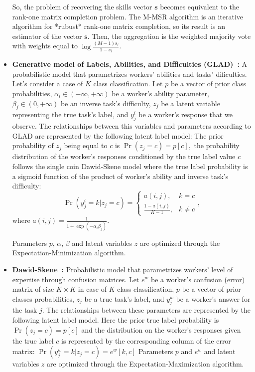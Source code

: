 \begin{itemize}
            So, the problem of recovering the skills vector $\boldsymbol{s}$ becomes equivalent to the
            rank-one matrix completion problem. The M-MSR algorithm is an iterative algorithm for *rubust* rank-one matrix completion, so its result is an estimator of the vector $\boldsymbol{s}$.
            Then, the aggregation is the weighted majority vote with weights equal to
            $\log \frac{(M-1)s_i}{1-s_i}$.
    \item \textbf{Generative model of Labels, Abilities, and Difficulties (GLAD)~\cite{whitehill_Whose_2009}:}
    A probabilistic model that parametrizes workers' abilities and tasks' dificulties.
    Let's consider a case of $K$ class classification. Let $p$ be a vector of prior class probabilities, $\alpha_i \in (-\infty, +\infty)$ be a worker's ability parameter, $\beta_j \in (0, +\infty)$ be an inverse task's difficulty, $z_j$ be a latent variable representing the true task's label, and $y^i_j$ be a worker's response that we observe. The relationships between this variables and parameters according to GLAD are represented by the following latent label model:
    The prior probability of $z_j$ being equal to $c$ is $\operatorname{Pr}(z_j = c) = p[c],$
    the probability distribution of the worker's responses conditioned by the true label value $c$ follows the single coin Dawid-Skene model where the true label probability is a sigmoid function of the product of worker's ability and inverse task's difficulty:
    \begin{equation}
    \operatorname{Pr}(y^i_j = k | z_j = c) = \begin{cases}a(i, j), & k = c \\ \frac{1 - a(i,j)}{K-1}, & k \neq c\end{cases},
    \end{equation}
    where $a(i,j) = \frac{1}{1 + \exp(-\alpha_i\beta_j)}.$

    Parameters $p$, $\alpha$, $\beta$ and latent variables $z$ are optimized through the Expectation-Minimization algorithm.
    \item \textbf{Dawid-Skene~\cite{dawid_Maximum_1979}:}
    Probabilistic model that parametrizes workers' level of expertise through confusion matrices.   Let $e^w$ be a worker's confusion (error) matrix of size $K \times K$ in case of $K$ class classification, $p$ be a vector of prior classes probabilities, $z_j$ be a true task's label, and $y^w_j$ be a worker's answer for the task $j$. The relationships between these parameters are represented by the following latent label model.
    Here the prior true label probability is $\operatorname{Pr}(z_j = c) = p[c]$ and the distribution on the worker's responses given the true label $c$ is represented by the
    corresponding column of the error matrix: $\operatorname{Pr}(y_j^w = k | z_j = c) = e^w[k, c]$
    Parameters $p$ and $e^w$ and latent variables $z$ are optimized through the Expectation-Maximization algorithm.
\end{itemize}

